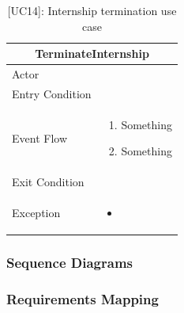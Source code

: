 \begin{table}[H]
    \centering
    \begin{tabular}{|p{3cm}|p{12cm}|}
    \hline
    \multicolumn{2}{|c|}{\textbf{TerminateInternship}} \\ \hline
    Actor & \\ \hline
    Entry Condition & \\ \hline
    Event Flow &      
    \begin{enumerate}         
        \item Something
        \item Something
    \end{enumerate} \\ \hline
    Exit Condition & \\ \hline
    Exception & 
    \begin{itemize}         
        \item      
    \end{itemize} \\ \hline  
    \end{tabular}
    \caption{[UC14]: Internship termination use case}
    \label{tab:UC14}
\end{table}


\subsubsection{Sequence Diagrams}

\clearpage
\subsubsection{Requirements Mapping}

